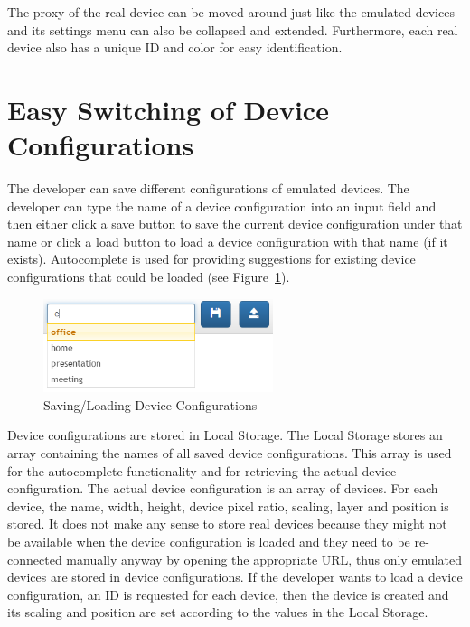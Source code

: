 The proxy of the real device can be moved around just like the emulated devices and its settings menu can also be collapsed and extended. Furthermore, each real device also has a unique ID and color for easy identification.

\section{Easy Switching of Device Configurations}

The developer can save different configurations of emulated devices. The developer can type the name of a device configuration into an input field and then either click a save button to save the current device configuration under that name or click a load button to load a device configuration with that name (if it exists). Autocomplete is used for providing suggestions for existing device configurations that could be loaded (see Figure~\ref{fig:session_management}). 

\begin{figure}[H]
  \centering
    \includegraphics[width=0.6\textwidth]{images/screenshots/session_management_2.png}
	\caption[Screenshot: Saving/Loading device configurations]{Saving/Loading Device Configurations}
	\label{fig:session_management}
\end{figure}

Device configurations are stored in Local Storage. The Local Storage stores an array containing the names of all saved device configurations. This array is used for the autocomplete functionality and for retrieving the actual device configuration. The actual device configuration is an array of devices. For each device, the name, width, height, device pixel ratio, scaling, layer and position is stored. It does not make any sense to store real devices because they might not be available when the device configuration is loaded and they need to be re-connected manually anyway by opening the appropriate URL, thus only emulated devices are stored in device configurations. If the developer wants to load a device configuration, an ID is requested for each device, then the device is created and its scaling and position are set according to the values in the Local Storage.

